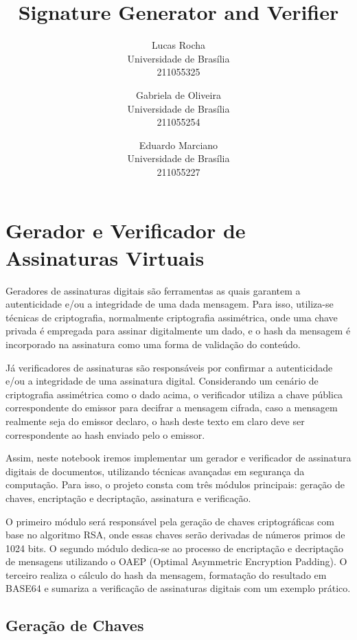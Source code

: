 \documentclass[11pt]{article}
\title{Signature Generator and Verifier\\[1.5em]}
\author{
        Lucas Rocha \\ Universidade de Brasília \\ 211055325
        \and
        Gabriela de Oliveira \\ Universidade de Brasília \\ 211055254
        \and
        Eduardo Marciano \\ Universidade de Brasília \\ 211055227
    }
\date{}
\begin{document}
    
    \maketitle
    
    

    
    \hypertarget{gerador-e-verificador-de-assinaturas-virtuais}{%
\section{Gerador e Verificador de Assinaturas
Virtuais}\label{gerador-e-verificador-de-assinaturas-virtuais}}

Geradores de assinaturas digitais são ferramentas as quais garantem a
autenticidade e/ou a integridade de uma dada mensagem. Para isso,
utiliza-se técnicas de criptografia, normalmente criptografia
assimétrica, onde uma chave privada é empregada para assinar
digitalmente um dado, e o hash da mensagem é incorporado na assinatura
como uma forma de validação do conteúdo.

Já verificadores de assinaturas são responsáveis por confirmar a
autenticidade e/ou a integridade de uma assinatura digital. Considerando
um cenário de criptografia assimétrica como o dado acima, o verificador
utiliza a chave pública correspondente do emissor para decifrar a
mensagem cifrada, caso a mensagem realmente seja do emissor declaro, o
hash deste texto em claro deve ser correspondente ao hash enviado pelo o
emissor.

Assim, neste notebook iremos implementar um gerador e verificador de
assinatura digitais de documentos, utilizando técnicas avançadas em
segurança da computação. Para isso, o projeto consta com três módulos
principais: geração de chaves, encriptação e decriptação, assinatura e
verificação.

O primeiro módulo será responsável pela geração de chaves criptográficas
com base no algoritmo RSA, onde essas chaves serão derivadas de números
primos de 1024 bits. O segundo módulo dedica-se ao processo de
encriptação e decriptação de mensagens utilizando o OAEP (Optimal
Asymmetric Encryption Padding). O terceiro realiza o cálculo do hash da
mensagem, formatação do resultado em BASE64 e sumariza a verificação de
assinaturas digitais com um exemplo prático.

    \hypertarget{gerauxe7uxe3o-de-chaves}{%
\subsection{Geração de Chaves}\label{gerauxe7uxe3o-de-chaves}}
\end{document}
